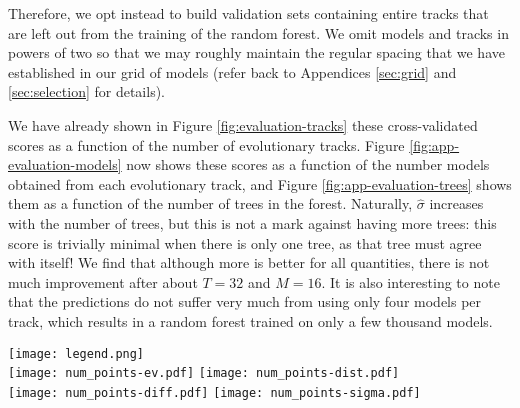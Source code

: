 \documentclass[manuscript,linenumbers]{aastex6}
\begin{document}
Therefore, we opt instead to build validation sets containing entire tracks that are left out from the training of the random forest. We omit models and tracks in powers of two so that we may roughly maintain the regular spacing that we have established in our grid of models (refer back to Appendices \ref{sec:grid} and \ref{sec:selection} for details). 

We have already shown in Figure \ref{fig:evaluation-tracks} these cross-validated scores as a function of the number of evolutionary tracks. Figure \ref{fig:app-evaluation-models} now shows these scores as a function of the number models obtained from each evolutionary track, and Figure \ref{fig:app-evaluation-trees} shows them as a function of the number of trees in the forest. Naturally, $\hat\sigma$ increases with the number of trees, but this is not a mark against having more trees: this score is trivially minimal when there is only one tree, as that tree must agree with itself! We find that although more is better for all quantities,  there is not much improvement after about $T=32$ and $M=16$. It is also interesting to note that the predictions do not suffer very much from using only four models per track, which results in a random forest trained on only a few thousand models. 

\begin{figure*}
    \centering
    \texttt{[image: legend.png]}\\
    \texttt{[image: num\_points-ev.pdf]}%
    \texttt{[image: num\_points-dist.pdf]}\\
    \texttt{[image: num\_points-diff.pdf]}%
    \texttt{[image: num\_points-sigma.pdf]}\\
    \caption{%
    Explained variance (top left), accuracy per precision distance (top right), normalized absolute error (bottom left), and normalized standard deviation of predictions (bottom right) for each stellar parameter as a function of the number of models per evolutionary track.} 
    \label{fig:app-evaluation-models}
\end{figure*}
\end{document}
